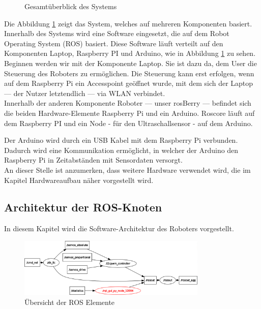 \documentclass[conference]{IEEEtran}
\begin{document}
	\begin{figure}[!ht]
		\centering
		\def\svgwidth{9cm}
		
		\caption{Gesamtüberblick des Systems}
		\label{Gesamtzusammenhang}
	\end{figure}
	Die Abbildung \ref{Gesamtzusammenhang} zeigt das System, welches auf mehreren Komponenten basiert.
	Innerhalb des Systems wird eine Software eingesetzt, die auf dem Robot Operating System (ROS) basiert.
	Diese Software läuft verteilt auf den Komponenten Laptop, Raspberry PI und Arduino, wie in Abbildung \ref{Gesamtzusammenhang} zu sehen.
	\\
	Beginnen werden wir mit der Komponente Laptop.
	Sie ist dazu da, dem User die Steuerung des Roboters zu ermöglichen.
	Die Steuerung kann erst erfolgen, wenn auf dem Raspberry Pi ein Accesspoint geöffnet wurde, mit dem sich der Laptop — der Nutzer letztendlich — via WLAN verbindet.
	\\
	Innerhalb der anderen Komponente Roboter — unser rosBerry — befindet sich die beiden Hardware-Elemente Raspberry Pi und ein Arduino. Roscore läuft auf dem Raspberry PI und ein Node - für den Ultraschallsensor - auf dem Arduino.
	
	Der Arduino wird durch ein USB Kabel mit dem Raspberry Pi verbunden.
	Dadurch wird eine Kommunikation ermöglicht, in welcher der Arduino den Raspberry Pi in Zeitabständen mit Sensordaten versorgt.
	\\
	An dieser Stelle ist anzumerken, dass weitere Hardware verwendet wird, die im Kapitel Hardwareaufbau näher vorgestellt wird.
	
	\subsection{Architektur der ROS-Knoten}\label{sec:Architektur}
	
	In diesem Kapitel wird die Software-Architektur des Roboters vorgestellt.
	
	\begin{figure}[!ht] 
		\centering
		\includegraphics[width=9cm]{img/rosgraph.png}
		\caption{Übersicht der ROS Elemente}
		\label{rosgraph}
	\end{figure}
	
\end{document}
